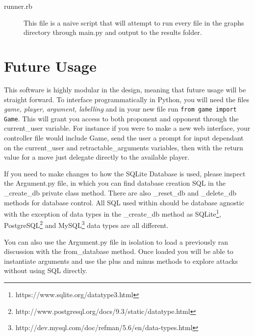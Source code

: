 \documentclass[BSc]{abdnthesis}
\theoremstyle{definition}
\theoremstyle{remark}
\begin{document}
\begin{description}
\item[runner.rb] This file is a naive script that will attempt to run every file in the graphs directory through main.py and output to the results folder.
\end{description}

\section{Future Usage}
This software is highly modular in the design, meaning that future usage will be straight forward. To interface programmatically in Python, you will need the files \emph{game, player, argument, labelling} and in your new file run \texttt{from game import Game}. This will grant you access to both proponent and opponent through the current\_user variable. For instance if you were to make a new web interface, your controller file would include Game, send the user a prompt for input dependant on the current\_user and retractable\_arguments variables, then with the return value for a move just delegate directly to the available player.

If you need to make changes to how the SQLite Database is used, please inspect the Argument.py file, in which you can find database creation SQL in the \_create\_db private class method. There are also \_reset\_db and \_delete\_db methods for database control. All SQL used within should be database agnostic with the exception of data types in the \_create\_db method as SQLite\footnote{https://www.sqlite.org/datatype3.html}, PostgreSQL\footnote{http://www.postgresql.org/docs/9.3/static/datatype.html} and MySQL\footnote{http://dev.mysql.com/doc/refman/5.6/en/data-types.html} data types are all different.

You can also use the Argument.py file in isolation to load a previously ran discussion with the from\_database method. Once loaded you will be able to instantiate arguments and use the plus and minus methods to explore attacks without using SQL directly.
\end{document}
